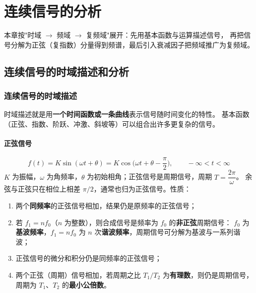 
\chapter{连续信号的分析}

本章按"时域 $\to$ 频域 $\to$ 复频域"展开：先用基本函数与运算描述信号，
再把信号分解为正弦（复指数）分量得到频谱，最后引入衰减因子把频域推广为复频域。

\section{连续信号的时域描述和分析}

\subsection{连续信号的时域描述}

时域描述就是用\textbf{一个时间函数或一条曲线}表示信号随时间变化的特性。
基本函数（正弦、指数、阶跃、冲激、斜坡等）可以组合出许多更复杂的信号。

\subsubsection{正弦信号}

\begin{equation}
f(t)=K\sin(\omega t+\theta)=K\cos\Big(\omega t+\theta-\frac{\pi}{2}\Big),\qquad -\infty<t<\infty
\end{equation}
$K$ 为振幅，$\omega$ 为角频率，$\theta$ 为初始相角；正弦信号是周期信号，周期 $T=\dfrac{2\pi}{\omega}$。
余弦与正弦只在相位上相差 $\pi/2$，通常也归为正弦信号。性质：

\begin{enumerate}
\item 两个\textbf{同频率}的正弦信号相加，结果仍是原频率的正弦信号；
\item 若 $f_1=nf_0$（$n$ 为整数），则合成信号是频率为 $f_0$ 的\textbf{非正弦}周期信号：
  $f_0$ 为\textbf{基波频率}，$f_1=nf_0$ 为 $n$ 次\textbf{谐波频率}，周期信号可分解为基波与一系列谐波；
\item 正弦信号的微分和积分仍是同频率的正弦信号；
\item 两个正弦（周期）信号相加，若周期之比 $T_1/T_2$ 为\textbf{有理数}，则仍是周期信号，
  周期为 $T_1$、$T_2$ 的\textbf{最小公倍数}。
\end{enumerate}

